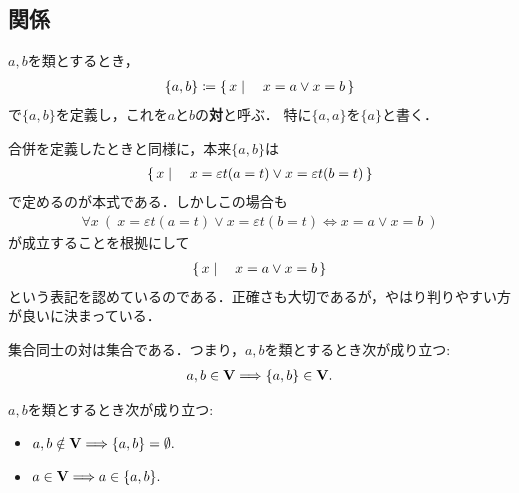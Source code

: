 \subsection{関係}
	\begin{screen}
		\begin{dfn}[対]
			$a,b$を類とするとき，
			\begin{align}
				\{a,b\} \coloneqq \left\{\, x \mid \quad x = a \vee x = b\, \right\}
			\end{align}
			で$\{a,b\}$を定義し，これを$a$と$b$の{\bf 対}と呼ぶ．
			特に$\{a,a\}$を$\{a\}$と書く．
		\end{dfn}
	\end{screen}
	
	合併を定義したときと同様に，本来$\{a,b\}$は
	\begin{align}
		\left\{\, x \mid \quad x = \varepsilon t(a=t) \vee x = \varepsilon t(b=t)\, \right\}
	\end{align}
	で定めるのが本式である．しかしこの場合も
	\begin{align}
		\forall x\ (\ x = \varepsilon t(a=t) \vee x = \varepsilon t(b=t)
		\Longleftrightarrow x = a \vee x = b\ )
	\end{align}
	が成立することを根拠にして
	\begin{align}
		\left\{\, x \mid \quad x = a \vee x = b\, \right\}
	\end{align}
	という表記を認めているのである．正確さも大切であるが，やはり判りやすい方が良いに決まっている．
	
	\begin{screen}
		\begin{axm}[対の公理]
			集合同士の対は集合である．つまり，$a,b$を類とするとき次が成り立つ:
			\begin{align}
				a,b \in \mathbf{V} \Longrightarrow \{a,b\} \in \mathbf{V}.
			\end{align}
		\end{axm}
	\end{screen}
	
	\begin{screen}
		\begin{thm}
			$a,b$を類とするとき次が成り立つ:
			\begin{itemize}
				\item $a,b \notin \mathbf{V} \Longrightarrow \{a,b\} = \emptyset.$
				\item $a \in \mathbf{V} \Longrightarrow a \in \{a,b\}.$
			\end{itemize}
		\end{thm}
	\end{screen}
	
